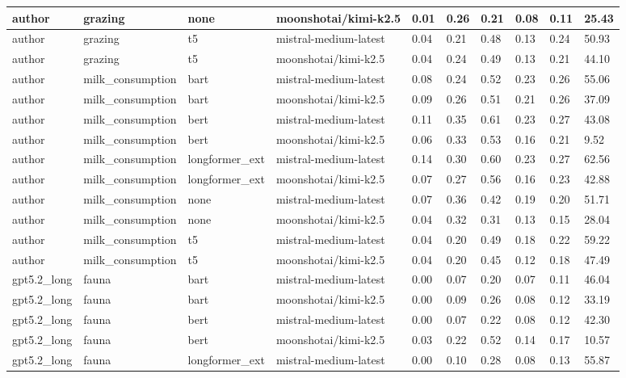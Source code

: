 \begin{tabular}{|l|l|l|l|l|l|l|l|l|l|}
 \hline
 author & grazing & none & moonshotai/kimi-k2.5 & 0.01 & 0.26 & 0.21 & 0.08 & 0.11 & 25.43 \\
 \hline
 author & grazing & t5 & mistral-medium-latest & 0.04 & 0.21 & 0.48 & 0.13 & 0.24 & 50.93 \\
 \hline
 author & grazing & t5 & moonshotai/kimi-k2.5 & 0.04 & 0.24 & 0.49 & 0.13 & 0.21 & 44.10 \\
 \hline
 author & milk\_consumption & bart & mistral-medium-latest & 0.08 & 0.24 & 0.52 & 0.23 & 0.26 & 55.06 \\
 \hline
 author & milk\_consumption & bart & moonshotai/kimi-k2.5 & 0.09 & 0.26 & 0.51 & 0.21 & 0.26 & 37.09 \\
 \hline
 author & milk\_consumption & bert & mistral-medium-latest & 0.11 & 0.35 & 0.61 & 0.23 & 0.27 & 43.08 \\
 \hline
 author & milk\_consumption & bert & moonshotai/kimi-k2.5 & 0.06 & 0.33 & 0.53 & 0.16 & 0.21 & 9.52 \\
 \hline
 author & milk\_consumption & longformer\_ext & mistral-medium-latest & 0.14 & 0.30 & 0.60 & 0.23 & 0.27 & 62.56 \\
 \hline
 author & milk\_consumption & longformer\_ext & moonshotai/kimi-k2.5 & 0.07 & 0.27 & 0.56 & 0.16 & 0.23 & 42.88 \\
 \hline
 author & milk\_consumption & none & mistral-medium-latest & 0.07 & 0.36 & 0.42 & 0.19 & 0.20 & 51.71 \\
 \hline
 author & milk\_consumption & none & moonshotai/kimi-k2.5 & 0.04 & 0.32 & 0.31 & 0.13 & 0.15 & 28.04 \\
 \hline
 author & milk\_consumption & t5 & mistral-medium-latest & 0.04 & 0.20 & 0.49 & 0.18 & 0.22 & 59.22 \\
 \hline
 author & milk\_consumption & t5 & moonshotai/kimi-k2.5 & 0.04 & 0.20 & 0.45 & 0.12 & 0.18 & 47.49 \\
 \hline
 gpt5.2\_long & fauna & bart & mistral-medium-latest & 0.00 & 0.07 & 0.20 & 0.07 & 0.11 & 46.04 \\
 \hline
 gpt5.2\_long & fauna & bart & moonshotai/kimi-k2.5 & 0.00 & 0.09 & 0.26 & 0.08 & 0.12 & 33.19 \\
 \hline
 gpt5.2\_long & fauna & bert & mistral-medium-latest & 0.00 & 0.07 & 0.22 & 0.08 & 0.12 & 42.30 \\
 \hline
 gpt5.2\_long & fauna & bert & moonshotai/kimi-k2.5 & 0.03 & 0.22 & 0.52 & 0.14 & 0.17 & 10.57 \\
 \hline
 gpt5.2\_long & fauna & longformer\_ext & mistral-medium-latest & 0.00 & 0.10 & 0.28 & 0.08 & 0.13 & 55.87 \\

\end{tabular}
